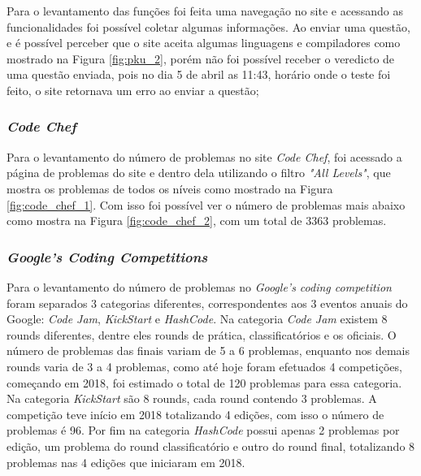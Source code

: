 Para o levantamento das funções foi feita uma navegação no site e acessando as funcionalidades foi possível coletar algumas informações. Ao enviar uma questão, e é possível perceber que o site aceita algumas linguagens e compiladores como mostrado na Figura \ref{fig:pku_2}, porém não foi possível receber o veredicto de uma questão enviada, pois no dia 5 de abril as 11:43, horário onde o teste foi feito, o site retornava um erro ao enviar a questão;



\subsubsection{\textit{Code Chef}}
\label{subsubsec:met_code_chef}

Para o levantamento do número de problemas no site \textit{Code Chef}, foi acessado a página de problemas do site e dentro dela utilizando o filtro \textit{"All Levels"}, que mostra os problemas de todos os níveis como mostrado na Figura \ref{fig:code_chef_1}. Com isso foi possível ver o número de problemas mais abaixo como mostra na Figura \ref{fig:code_chef_2}, com um total de 3363 problemas.


\subsubsection{\textit{Google's Coding Competitions}}
\label{subsubsec:met_google}

Para o levantamento do número de problemas no \textit{Google's coding competition} foram separados 3 categorias diferentes, correspondentes aos 3 eventos anuais do Google: \textit{Code Jam}, \textit{KickStart} e \textit{HashCode}. Na categoria \textit{Code Jam} existem 8 rounds diferentes, dentre eles rounds de prática, classificatórios e os oficiais. O número de problemas das finais variam de 5 a 6 problemas, enquanto nos demais rounds varia de 3 a 4 problemas, como até hoje foram efetuados 4 competições, começando em 2018, foi estimado o total de 120 problemas para essa categoria. Na categoria \textit{KickStart} são 8 rounds, cada round contendo 3 problemas. A competição teve início em 2018 totalizando 4 edições, com isso o número de problemas é 96. Por fim na categoria \textit{HashCode} possui apenas 2 problemas por edição, um problema do round classificatório e outro do round final, totalizando 8 problemas nas 4 edições que iniciaram em 2018.


